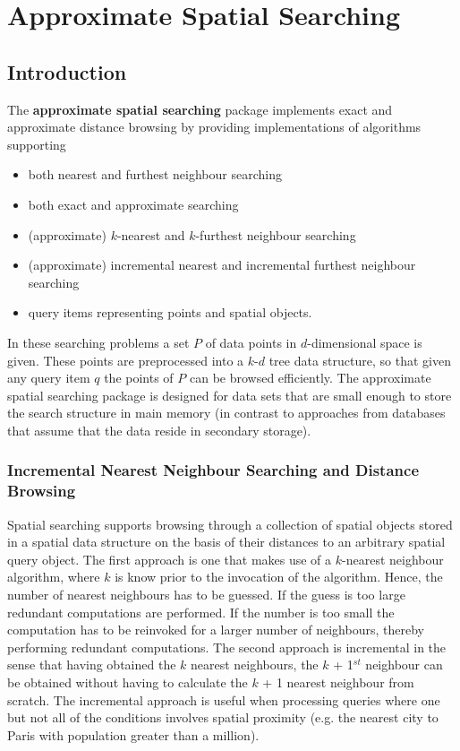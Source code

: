 \chapter{Approximate Spatial Searching}

\section{Introduction}

The {\bf approximate spatial searching} package implements
exact and approximate distance browsing
by providing implementations of algorithms supporting

\begin{itemize} 

\item
both nearest and furthest neighbour searching

\item
both exact and approximate searching

\item 
(approximate) $k$-nearest and $k$-furthest neighbour searching

\item 
(approximate) incremental nearest and incremental furthest neighbour searching

\item
query items representing points and spatial objects.

\end{itemize}

In these searching problems a set $P$ of data points in $d$-dimensional
space is given.
These points are preprocessed into a $k$-$d$ tree data structure, so that given
any query item $q$ the points of $P$ can be browsed efficiently.
The approximate spatial searching package is designed for data sets that are small enough to store
the search structure in main memory (in contrast to approaches
from databases that assume that the data reside in secondary storage).

\subsection{Incremental Nearest Neighbour Searching and Distance Browsing}

Spatial searching supports browsing through a collection of spatial objects
stored in a spatial data structure on the basis of their distances to an arbitrary spatial
query object. The first approach is one that makes use of a $k$-nearest neighbour
algorithm, where $k$ is know prior to the invocation of the algorithm.
Hence, the number of nearest neighbours has to be
guessed. If the guess is too large redundant computations are performed.
If the number is too small the computation has to be  
reinvoked for a larger number of neighbours, thereby performing redundant computations.
The second approach is incremental in the sense that having obtained
the $k$ nearest neighbours, the $k$ + 1$^{st}$ neighbour can be obtained without
having to calculate the $k$ + 1 nearest neighbour from scratch.
The incremental approach is useful when processing queries where
one but not all of the conditions involves spatial proximity (e.g. the nearest city to Paris with
population greater than a million).

